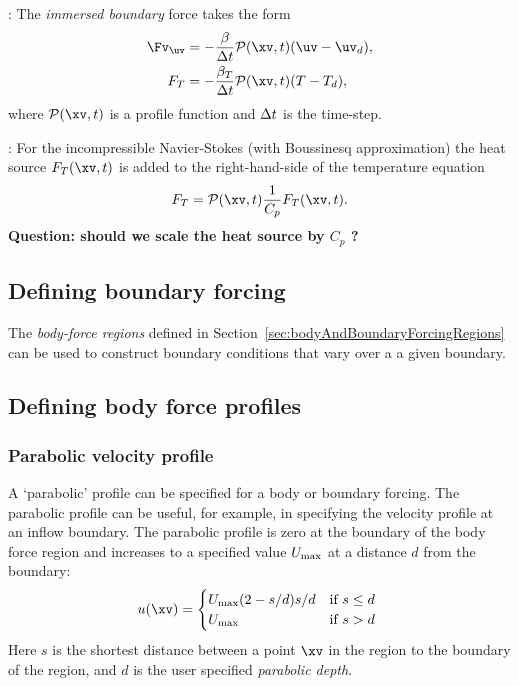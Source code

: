 : The {\em immersed boundary} force takes the form
\begin{align}
  \Fv_{\uv} & =  - \frac{\beta}{\dt}\Pc(\xv,t)( \uv - \uv_d ), \\
  F_T       & = - \frac{\beta_T}{\dt}\Pc(\xv,t)( T - T_d ), 
\end{align}
where $\Pc(\xv,t)$ is a profile function and ${\Delta t}$ is the time-step. 

: For the incompressible Navier-Stokes (with Boussinesq approximation) the heat source 
    $F_T(\xv,t)$ is added to the right-hand-side of the temperature equation 
\begin{align}
  F_T =  \Pc(\xv,t) \frac{1}{C_p} F_T(\xv,t) . 
\end{align}
{\bf Question: should we scale the heat source by $C_p$ ?}


\subsection{Defining boundary forcing} \label{sec:boundaryForcing}

The {\em body-force regions} defined in Section~\ref{sec:bodyAndBoundaryForcingRegions}
can be used to construct boundary conditions that vary over a a given boundary.



\subsection{Defining body force profiles} \label{sec:bodyAndBoundaryForcingProfiles}


\subsubsection{Parabolic velocity profile} \label{sec:parabolic}

  A `parabolic' profile can be specified for a body or boundary forcing.
The parabolic profile can be useful, for example,
in specifying the velocity profile at an inflow boundary.
The parabolic profile is zero at the
boundary of the body force region and increases to a specified value $U_{\rm max}$ at 
a distance $d$ from the boundary:
\[
     u(\xv) = \begin{cases}
               U_{\rm max} (2 -s/d ) s/d & \text{if $s\le d$ } \\
               U_{\rm max} &     \text{if $s> d$ }
              \end{cases}
\]
Here $s$ is the shortest distance between a point $\xv$ in the region to the 
boundary of the region, 
and $d$ is the user specified {\it parabolic depth}.

% 
% 
